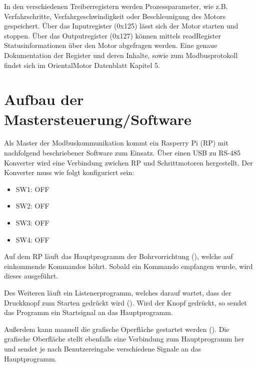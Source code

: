 \documentclass[letterpaper,10pt,english]{sphinxmanual}
\begin{document}
In den verschiedenen Treiberregistern werden Prozessparameter, wie z.B. Verfahrschritte,
Verfahrgeschwindigkeit oder Beschleunigung des Motors gespeichert. Über das Inputregister (0x125)
lässt sich der Motor starten und stoppen. Über das Outputregister (0x127) können mittels readRegister
Statusinformationen über den Motor abgefragen werden. Eine genaue Dokumentation der Register
und deren Inhalte, sowie zum Modbusprotokoll findet sich im OrientalMotor Datenblatt Kapitel 5.


\section{Aufbau der Mastersteuerung/Software}
\label{_xfcberblick:aufbau-der-mastersteuerung-software}
Als Master der Modbuskommunikation kommt ein Rasperry Pi (RP) mit nachfolgend beschriebener Software zum Einsatz.
Über einen USB zu RS-485 Konverter wird eine Verbindung zwichen RP und Schrittmotoren hergestellt. Der
Konverter muss wie folgt konfiguriert sein:
\begin{itemize}
\item {} 
SW1: OFF

\item {} 
SW2: OFF

\item {} 
SW3: OFF

\item {} 
SW4: OFF

\end{itemize}

Auf dem RP läuft das Hauptprogramm der Bohrvorrichtung ({\hyperref[bohrvorrichtung:module\string-bohrvorrichtung]{}}), welche auf einkommende
Kommandos höhrt. Sobald ein Kommando empfangen wurde, wird dieses ausgeführt.

Des Weiteren läuft ein Listenerprogramm, welches darauf wartet, dass der Druckknopf zum Starten gedrückt
wird ({\hyperref[button:module\string-button]{}}). Wird der Knopf gedrückt, so sendet das Programm ein Startsignal an das Hauptprogramm.

Außerdem kann manuell die grafische Operfläche gestartet werden ({\hyperref[gui:module\string-gui]{}}). Die grafische Oberfläche
stellt ebenfalls eine Verbindung zum Hauptprogramm her und sendet je nach Benutzereingabe verschiedene
Signale an das Hauptprogramm.
\end{document}
